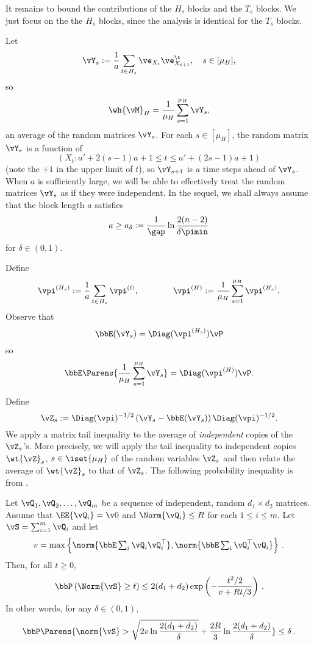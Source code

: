 It remains to bound the contributions of the $H_s$ blocks and the
$T_s$ blocks.
We just focus on the the $H_s$ blocks, since the analysis is identical
for the $T_s$ blocks.

Let
\[
  \vY_s := \frac1a \sum_{t \in H_s} \ve_{X_t} \ve_{X_{t+1}}^\t ,
  \quad s \in [\mu_H] ,
\]
so
\[
  \wh{\vM}_H = \frac1{\mu_H} \sum_{s=1}^{\mu_H} \vY_s ,
\]
an average of the random matrices $\vY_s$.
For each $s \in [\mu_H]$, the random matrix $\vY_s$ is a function of
\[ (X_t : a' + 2(s-1)a + 1 \leq t \leq a' + (2s-1)a + 1) \]
(note the $+1$ in the upper limit of $t$),
so $\vY_{s+1}$ is $a$ time steps ahead of $\vY_s$.
When $a$ is sufficiently large, we will be able to effectively treat
the random matrices $\vY_s$ as if they were independent.
In the sequel, we shall always assume that the block length $a$
satisfies
\begin{equation}
  \label{eq:block-length}
  a \geq
  a_\delta
  :=
  \frac{1}{\gap} \ln \frac{2(n-2)}{\delta\pimin}
\end{equation}
for $\delta \in (0,1)$.

Define
\begin{align*}
  \vpi^{(H_s)}  := \frac1a \sum_{t \in H_s} \vpi^{(t)} , \qquad \qquad
  \vpi^{(H)}  := \frac1{\mu_H} \sum_{s=1}^{\mu_H} \vpi^{(H_s)} .
\end{align*}
Observe that
\[
  \bbE(\vY_s)
  = \Diag(\vpi^{(H_s)}) \vP
\]
so
\[
  \bbE\Parens{
    \frac1{\mu_H} \sum_{s=1}^{\mu_H} \vY_s
  } = \Diag(\vpi^{(H)}) \vP
  .
\]

Define
\[
  \vZ_s
  := \Diag(\vpi)^{-1/2} \left( \vY_s 
  - \bbE(\vY_s) \right)\Diag(\vpi)^{-1/2}
  .
\]
We apply a matrix tail inequality to the average of \emph{independent}
copies of the $\vZ_s$'s.
More precisely, we will apply the tail inequality to independent
copies $\wt{\vZ}_s$, $s\in \iset{\mu_H}$ of the random variables
$\vZ_s$ and then relate the average of $\wt{\vZ}_s$ to that of
$\vZ_s$.
The following probability inequality is from \citet[Theorem
6.1.1.]{tropp2015intro}.
\begin{theorem}
\label{thm:mxbernstein}
Let $\vQ_1,\vQ_2,\dotsc,\vQ_m$ be a sequence of independent, random
$d_1 \times d_2$ matrices.
Assume that $\EE{\vQ_i} = \v0$ and $\Norm{\vQ_i}\le R$ for each $1\le
i \le m$.
Let $\vS = \sum_{i=1}^m \vQ_i$ and let 
\begin{align*}
v = \max\left\{ \norm{\bbE \textstyle\sum_i \vQ_i \vQ_i^\top  }, 
						      \norm{\bbE \textstyle\sum_i \vQ_i^\top \vQ_i  }
			\right\}\,.
\end{align*}
Then, for all $t\ge 0$, 
\[
\bbP\left( \Norm{\vS} \ge t \right) \le 2(d_1 + d_2) \exp\left( -\frac{t^2/2}{v+R t/3}\right)\,.
\]
In other words, for any $\delta \in (0,1)$,
\[
  \bbP\Parens{
    \norm{\vS} > \sqrt{2 v \ln \frac{2(d_1+d_2)}{\delta}} + \frac{2R}{3}
    \ln\frac{2(d_1+d_2)}{\delta}
  } \leq \delta
  \,.
\]
\end{theorem}

